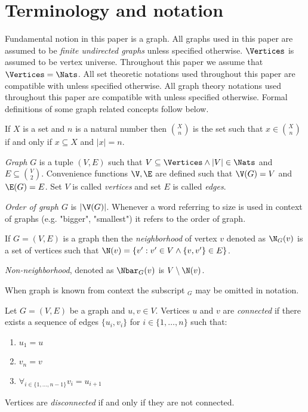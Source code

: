 
\section{Terminology and notation}

Fundamental notion in this paper is a graph. All graphs used in this paper are assumed to be \emph{finite undirected graphs} unless specified otherwise. $\Vertices$ is assumed to be vertex universe. Throughout this paper we assume that $\Vertices = \Nats$. All set theoretic notations used throughout this paper are compatible with \cite{jech} unless specified otherwise. All graph theory notations used throughout this paper are compatible with \cite{bollobas} unless specified otherwise. Formal definitions of some graph related concepts follow below.

\begin{defi}
    If $X$ is a set and $n$ is a natural number then $\binom{X}{n}$ is the set such that $x \in \binom{X}{n}$ if and only if $x \subseteq X$ and $|x| = n$.
\end{defi}

\begin{defi}
    \emph{Graph} $G$ is a tuple $(V,E)$ such that $V \subseteq \Vertices \land |V| \in \Nats$ and $E \subseteq \binom{V}{2}$. Convenience functions $\V, \E$ are defined such that $\V(G) = V$ and $\E(G) = E$. Set $V$ is called \emph{vertices} and set $E$ is called \emph{edges}.
\end{defi}

\begin{defi}
    \emph{Order of graph $G$} is $|\V(G)|$. Whenever a word referring to size is used in context of graphs (e.g. "bigger", "smallest") it refers to the order of graph.
\end{defi}

\begin{defi}
    If $G = (V,E)$ is a graph then the \emph{neighborhood} of vertex $v$ denoted as $\N_G(v)$ is a set of vertices such that $\N(v) = \{v' : v' \in V \land \{v, v'\} \in E\}$.

    \emph{Non-neighborhood}, denoted as $\Nbar_G(v)$ is $V \setminus \N(v)$.

    When graph is known from context the subscript $_G$ may be omitted in notation.
\end{defi}

\begin{defi}
    Let $G = (V,E)$ be a graph and $u, v \in V$. Vertices $u$ and $v$ are \emph{connected} if there exists a sequence of edges $\{u_i,v_i\}$ for $i \in \{1, \ldots, n\}$ such that:
    \begin{enumerate}
        \item $u_1 = u$
        \item $v_n = v$
        \item $\forall_{i \in \{1, \ldots, n - 1\}} v_i = u_{i+1}$
    \end{enumerate}

    Vertices are \emph{disconnected} if and only if they are not connected.
\end{defi}

